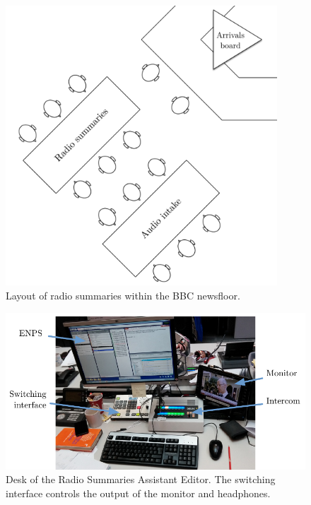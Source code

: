 \begin{figure}
	\centering
	\includegraphics[width=4in]{figs/news-layout.pdf}
  \caption{Layout of radio summaries within the BBC newsfloor.}
	\label{fig:newsroom-layout}
\end{figure}

\begin{figure}
  \centering
  \includegraphics[width=\columnwidth]{figs/news-desk-labelled.pdf}
  \caption{Desk of the Radio Summaries Assistant Editor. The switching interface controls the output of the monitor and
    headphones.}
  \label{fig:news-desktop}
\end{figure}

